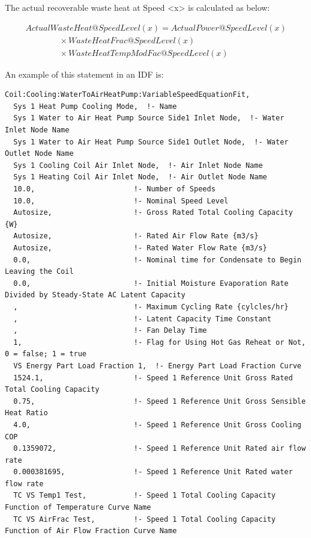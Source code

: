 The actual recoverable waste heat at Speed \textless{}x\textgreater{} is calculated as below:

\begin{equation}
  \begin{array}{l}
    ActualWasteHeat@SpeedLevel\left( x \right) = ActualPower@SpeedLevel\left( x \right) \\
    \quad \quad \quad \quad \times WasteHeatFrac@SpeedLevel(x) \\
    \quad \quad \quad \quad \times WasteHeatTempModFac@SpeedLevel(x)
  \end{array}
\end{equation}

An example of this statement in an IDF is:

\begin{lstlisting}
Coil:Cooling:WaterToAirHeatPump:VariableSpeedEquationFit,
  Sys 1 Heat Pump Cooling Mode,  !- Name
  Sys 1 Water to Air Heat Pump Source Side1 Inlet Node,  !- Water Inlet Node Name
  Sys 1 Water to Air Heat Pump Source Side1 Outlet Node,  !- Water Outlet Node Name
  Sys 1 Cooling Coil Air Inlet Node,  !- Air Inlet Node Name
  Sys 1 Heating Coil Air Inlet Node,  !- Air Outlet Node Name
  10.0,                       !- Number of Speeds
  10.0,                       !- Nominal Speed Level
  Autosize,                   !- Gross Rated Total Cooling Capacity {W}
  Autosize,                   !- Rated Air Flow Rate {m3/s}
  Autosize,                   !- Rated Water Flow Rate {m3/s}
  0.0,                        !- Nominal time for Condensate to Begin Leaving the Coil
  0.0,                        !- Initial Moisture Evaporation Rate Divided by Steady-State AC Latent Capacity
  ,                           !- Maximum Cycling Rate {cylcles/hr}
  ,                           !- Latent Capacity Time Constant
  ,                           !- Fan Delay Time
  1,                          !- Flag for Using Hot Gas Reheat or Not, 0 = false; 1 = true
  VS Energy Part Load Fraction 1,  !- Energy Part Load Fraction Curve
  1524.1,                     !- Speed 1 Reference Unit Gross Rated Total Cooling Capacity
  0.75,                       !- Speed 1 Reference Unit Gross Sensible Heat Ratio
  4.0,                        !- Speed 1 Reference Unit Gross Cooling COP
  0.1359072,                  !- Speed 1 Reference Unit Rated air flow rate
  0.000381695,                !- Speed 1 Reference Unit Rated water flow rate
  TC VS Temp1 Test,           !- Speed 1 Total Cooling Capacity Function of Temperature Curve Name
  TC VS AirFrac Test,         !- Speed 1 Total Cooling Capacity Function of Air Flow Fraction Curve Name

\end{lstlisting}
